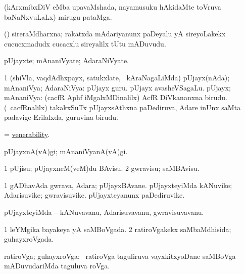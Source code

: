 \bentry
{} 
\gl{\nA}
\expl{}
\bmng
 (kArxmibxDiV eMba upavaMshada, nayamusuku hAkidaMte toVruva baNaNxvuLaLx) mirugu pataMga. 
\emng
\eentry

\bentry
{} 
\gl{\nA}
\expl{}
\bmng
 (\veYshA) sireraMdharxna; rakatxda mAdariyanunx paDeyalu yA sireyoLakekx cucucxmadudx cucacxlu sireyalilx tUtu mADuvudu. 
\emng
\eentry

\bentry
{} 
\gl{\nA}
\expl{}
\bmng
 pUjayxte; mAnaniVyate; AdaraNiVyate. 
\emng
\eentry

\bentry
{} 
\gl{\gu}
\expl{}
\bmng
\bnum
\num{1} (shiVla, vaqdAdhxpayx, satukxlate, \mo\ kAraNagaLiMda) pUjayx(nAda); mAnaniVya; AdaraNiVya:  pUjayx guru.  pUjayx avasheVSagaLu. 
 pUjayx; mAnaniVya: 
\banum
{} (cacfR Aphf iMgalxMDinalilx) AcfR DiVkananxna birudu. 
 (\roVkAyx\ cacfRnalilx) takakxSuTx pUjayxsAthxna paDediruva, Adare inUnx saMta padavige Erilalxda, guruvina birudu. 
\eanum
\numie
\enum
\emng
\eentry

\bentry
{} 
\gl{\nA}
\expl{}
\bmng
 = \hyperlink{venerability}{venerability}. 
\emng
\eentry

\bentry
{} 
\gl{\kirxvi}
\expl{}
\bmng
 pUjayxnA(vA)gi; mAnaniVyanA(vA)gi. 
\emng
\eentry

\bentry
{} 
\gl{\sakirx}
\expl{}
\bmng
\bnum
\num{1} pUjisu; pUjayxneM(veM)du BAvisu. 
\num{2} gwravisu; saMBAvisu. 
\enum
\emng
\eentry

\bentry
{} 
\gl{\nA}
\expl{}
\bmng
\bnum
\num{1} gADhavAda gwrava, Adara; pUjayxBAvane. 
\banum
{} pUjayxteyiMda kANuvike; Adarisuvike; gwravisuvike. 
 pUjayxteyanunx paDediruvike. 
\eanum
\numie
\enum
\emng
\eentry

\bentry
{} 
\gl{\nA}
\expl{}
\bmng
 pUjayxteyiMda -- kANuvavanu, Adarisuvavanu, gwravisuvavanu. 
\emng
\eentry

\bentry
{} 
\gl{\gu}
\expl{}
\bmng
\bnum
\num{1} leYMgika bayakeya yA saMBoVgada. 
\num{2} ratiroVgakekx saMbaMdhisida; guhayxroVgada. 
\enum
\emng
\eentry

\bentry
{}
\gl{\nA}
\expl{}
\bmng
 ratiroVga; guhayxroVga: \kanmu\ ratiroVga taguliruva vayxkitxyoDane saMBoVga mADuvudariMda taguluva roVga. 
\emng
\eentry

